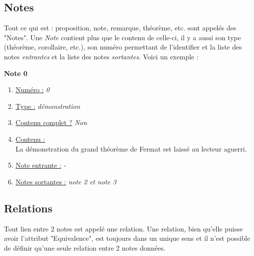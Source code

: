\documentclass[12pt,a4paper]{article}
\begin{document}
	\subsection{Notes}
	
	Tout ce qui est : proposition, note, remarque, théorème, etc. sont appelés des "Notes". Une \textit{Note} contient plus que le contenu de celle-ci, il y a aussi son type (théorème, corollaire, etc.), son numéro permettant de l'identifier et la liste des notes \textit{entrantes} et la liste des notes \textit{sortantes}. Voici un exemple :
	\begin{center}
		\textbf{Note 0}
	\end{center}
	\begin{enumerate}
		\item \underline{Numéro :} \textit{0}
		\item \underline{Type :} \textit{démonstration}
		\item \underline{Contenu complet ?} \textit{Non}
		\item \underline{Contenu :}\\
		\hspace*{.5cm} La démonstration du grand théorème de Fermat est laissé au lecteur aguerri.
		\item \underline{Note entrante :}\textit{ -}
		\item \underline{Notes sortantes :}\textit{ note 2 et note 3}
	\end{enumerate}
	
	\subsection{Relations}
	
	Tout lien entre 2 notes est appelé une relation. Une relation, bien qu'elle puisse avoir l’attribut "Equivalence", est toujours dans un unique sens et il n'est possible de définir qu'une seule relation entre 2 notes données. 
	
\end{document}

